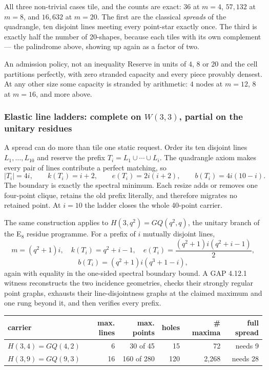 \documentclass[11pt,letterpaper]{article}
\newcommand{\tagbox}[3]{\tikz[baseline=(X.base)]{\node[inner xsep=3.5pt,inner ysep=1.4pt,rounded corners=1.6pt,fill=#1,text=#2,font=\bfseries\sffamily\tiny] (X) {#3};}}
\newcommand{\PROVED}{\tagbox{greenlite}{green!45!black}{PROVED}}
\newcommand{\W}{\ensuremath{W(3,3)}}
\begin{document}
All three non-trivial cases tile, and the counts are exact: $36$ at $m=4$,
$57{,}132$ at $m=8$, and $16{,}632$ at $m=20$. The first are the classical
\emph{spreads} of the quadrangle, ten disjoint lines meeting every point-star
exactly once. The third is exactly half the number of 20-shapes, because each
tiles with its own complement --- the palindrome above, showing up again as a
factor of two.

\begin{resultbox}{An admission policy, not an inequality}
Reserve in units of $4$, $8$ or $20$ and the cell partitions perfectly, with
zero stranded capacity and every piece provably densest. At any other size some
capacity is stranded by arithmetic: $4$ nodes at $m=12$, $8$ at $m=16$, and more
above. \PROVED
\end{resultbox}

\subsubsection{Elastic line ladders: complete on \W{}, partial on the unitary residues}

A spread can do more than tile one static request. Order its ten disjoint lines
$L_1,\ldots,L_{10}$ and reserve the prefix
$T_i=L_1\cup\cdots\cup L_i$. The quadrangle axiom makes every pair of lines
contribute a perfect matching, so
\[
 |T_i|=4i,\qquad k(T_i)=i+2,\qquad
 e(T_i)=2i(i+2),\qquad b(T_i)=4i(10-i).
\]
The boundary is exactly the spectral minimum. Each resize adds or removes one
four-point clique, retains the old prefix literally, and therefore migrates no
retained point. At $i=10$ the ladder closes the whole 40-point carrier. \PROVED

The same construction applies to $H(3,q^2)=GQ(q^2,q)$, the unitary branch of
the E$_8$ residue programme. For a prefix of $i$ mutually disjoint lines,
\[
 m=(q^2+1)i,\quad k(T_i)=q^2+i-1,\quad
 e(T_i)=\frac{(q^2+1)i(q^2+i-1)}2,
\]
\[
 b(T_i)=(q^2+1)i(q^3+1-i),
\]
again with equality in the one-sided spectral boundary bound. A GAP 4.12.1
witness reconstructs the two incidence geometries, checks their strongly
regular point graphs, exhausts their line-disjointness graphs at the claimed
maximum and one rung beyond it, and then verifies every prefix.

\begin{center}
\renewcommand{\arraystretch}{1.2}
\begin{tabular}{@{}lrrrrr@{}}
\toprule
carrier & max. lines & max. points & holes & \# maxima & full spread \\
\midrule
$H(3,4)=GQ(4,2)$ & 6 & 30 of 45 & 15 & 72 & needs 9 \\
$H(3,9)=GQ(9,3)$ & 16 & 160 of 280 & 120 & 2,268 & needs 28 \\
\bottomrule
\end{tabular}
\end{center}
\end{document}
